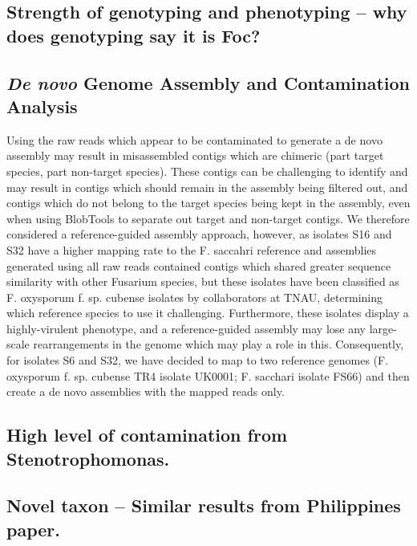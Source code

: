 \subsection{Strength of genotyping and phenotyping – why does genotyping say it is Foc?}
\subsection{\textit{De novo} Genome Assembly and Contamination Analysis}
Using the raw reads which appear to be contaminated to generate a de novo assembly may result in misassembled contigs which are chimeric (part target species, part non-target species). These contigs can be challenging to identify and may result in contigs which should remain in the assembly being filtered out, and contigs which do not belong to the target species being kept in the assembly, even when using BlobTools to separate out target and non-target contigs. We therefore considered a reference-guided assembly approach, however, as isolates S16 and S32 have a higher mapping rate to the F. saccahri reference and assemblies generated using all raw reads contained contigs which shared greater sequence similarity with other Fusarium species, but these isolates have been classified as F. oxysporum f. sp. cubense isolates by collaborators at TNAU, determining which reference species to use it challenging. Furthermore, these isolates display a highly-virulent phenotype, and a reference-guided assembly may lose any large-scale rearrangements in the genome which may play a role in this. Consequently, for isolates S6 and S32, we have decided to map to two reference genomes (F. oxysporum f. sp. cubense TR4 isolate UK0001; F. sacchari isolate FS66) and then create a de novo assemblies with the mapped reads only.  
\subsection{High level of contamination from Stenotrophomonas.}
\subsection{Novel taxon – Similar results from Philippines paper.}


